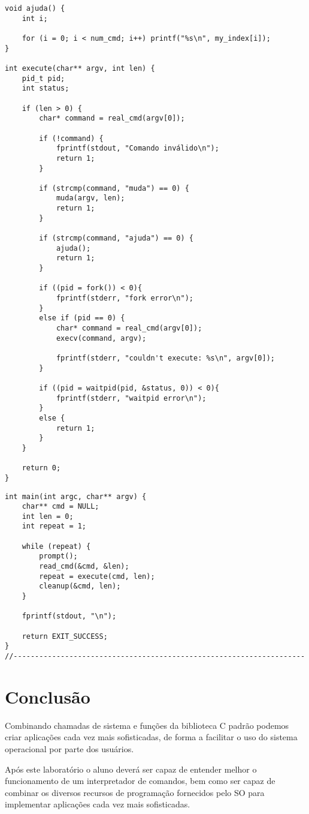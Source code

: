 \newpage
\begin{espacosimples}
\begin{verbatim}
void ajuda() {
    int i;
    
    for (i = 0; i < num_cmd; i++) printf("%s\n", my_index[i]);
}

int execute(char** argv, int len) {
    pid_t pid;
    int status;
    
    if (len > 0) {
        char* command = real_cmd(argv[0]);
        
        if (!command) {
            fprintf(stdout, "Comando inválido\n");
            return 1;
        }
        
        if (strcmp(command, "muda") == 0) {
            muda(argv, len);
            return 1;
        }
        
        if (strcmp(command, "ajuda") == 0) {
            ajuda();
            return 1;
        }
        
        if ((pid = fork()) < 0){
            fprintf(stderr, "fork error\n");
        }
        else if (pid == 0) {
            char* command = real_cmd(argv[0]);
            execv(command, argv);
            
            fprintf(stderr, "couldn't execute: %s\n", argv[0]);
        }
        
        if ((pid = waitpid(pid, &status, 0)) < 0){
            fprintf(stderr, "waitpid error\n");
        }
        else {
            return 1;
        }
    }
    
    return 0;
}
\end{verbatim}
\end{espacosimples}

\newpage
\begin{espacosimples}
\begin{verbatim}
int main(int argc, char** argv) {
    char** cmd = NULL;
    int len = 0;
    int repeat = 1;
    
    while (repeat) {
        prompt();
        read_cmd(&cmd, &len);
        repeat = execute(cmd, len);
        cleanup(&cmd, len);
    }
    
    fprintf(stdout, "\n");
    
    return EXIT_SUCCESS;
}
//--------------------------------------------------------------------
\end{verbatim}
\end{espacosimples}

\section{Conclusão}

Combinando chamadas de sistema e funções da biblioteca C padrão podemos criar aplicações cada vez mais sofisticadas, de forma a facilitar o uso do sistema operacional por parte dos usuários.

Após este laboratório o aluno deverá ser capaz de entender melhor o funcionamento de um interpretador de comandos, bem como ser capaz de combinar os diversos recursos de programação fornecidos pelo SO para implementar aplicações cada vez mais sofisticadas.